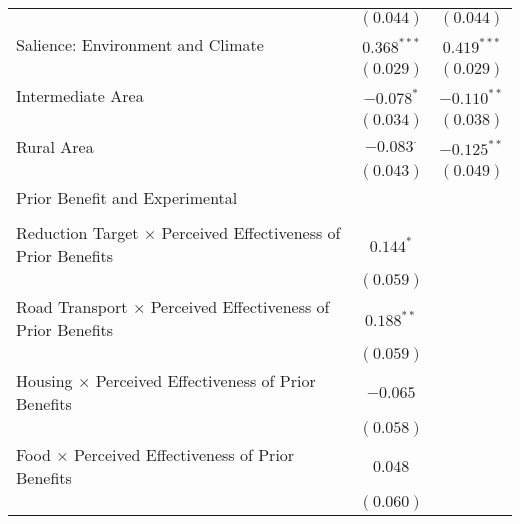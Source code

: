 \begin{center}
\begin{tiny}
\begin{longtable}{l@{} c@{} c@{}}
                                                                            & $(0.044)$        & $(0.044)$        \\
\quad Salience: Environment and Climate                                     & $0.368^{***}$    & $0.419^{***}$    \\
                                                                            & $(0.029)$        & $(0.029)$        \\
Intermediate Area                                                           & $-0.078^{*}$     & $-0.110^{**}$    \\
                                                                            & $(0.034)$        & $(0.038)$        \\
Rural Area                                                                  & $-0.083^{\cdot}$ & $-0.125^{**}$    \\
                                                                            & $(0.043)$        & $(0.049)$        \\
Prior Benefit and Experimental                                              &                  &                  \\
                                                                            &                  &                  \\
\quad Reduction Target $\times$ Perceived Effectiveness of Prior Benefits   & $0.144^{*}$      &                  \\
                                                                            & $(0.059)$        &                  \\
\quad Road Transport $\times$ Perceived Effectiveness of Prior Benefits     & $0.188^{**}$     &                  \\
                                                                            & $(0.059)$        &                  \\
\quad Housing $\times$ Perceived Effectiveness of Prior Benefits            & $-0.065$         &                  \\
                                                                            & $(0.058)$        &                  \\
\quad Food $\times$ Perceived Effectiveness of Prior Benefits               & $0.048$          &                  \\
                                                                            & $(0.060)$        &                  \\

\end{longtable}
\end{tiny}
\end{center}
